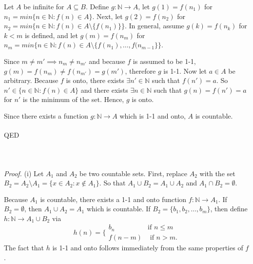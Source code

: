 \documentclass{article}
\begin{document}
            Let $A$ be infinite for $A \subseteq B$. Define $g:\mathbb{N} \to A$, let $g(1) = f(n_1)$ for $n_1 = min\{n \in \mathbb{N}: f(n) \in A\}$. Next, let $g(2) = f(n_2)$ for $n_2 = min\{n \in \mathbb{N}: f(n) \in A \setminus \{f(n_1)\}\}$. In general, assume $g(k) = f(n_k)$ for $k<m$ is defined, and let $g(m) = f(n_m)$ for $n_m = min\{n \in \mathbb{N}: f(n) \in A \setminus \{f(n_1), \dots, f(n_{m-1}\}\}$.
            
            Since $m \neq m' \implies n_m \neq n_{m'}$ and because $f$ is assumed to be 1-1, $g(m) = f(n_m) \neq f(n_{m'}) = g(m')$, therefore $g$ is 1-1. Now let $a \in A$ be arbitrary. Because $f$ is onto, there exists $\exists n' \in \mathbb{N}$ such that $f(n')=a$. So $n' \in \{n \in \mathbb{N} : f(n) \in A\}$ and there exists $\exists n \in \mathbb{N}$ such that $g(n) = f(n') = a$ for $n'$ is the minimum of the set. Hence, $g$ is onto.
            
            Since there exists a function $g: \mathbb{N} \to A$ which is 1-1 and onto, $A$ is countable.\\ \\
            QED \\ \\
            \\ \\
            \textit{Proof.} (i) Let $A_1$ and $A_2$ be two countable sets. First, replace $A_2$ with the set $B_2 = A_2 \setminus A_1 = \{x \in A_2 : x \notin A_1\}$. So that $A_1 \cup B_2 = A_1 \cup A_2$ and $A_1 \cap B_2 = \emptyset$.
            
            Because $A_1$ is countable, there exists a 1-1 and onto function $f: \mathbb{N} \to A_1$. If $B_2 = \emptyset$, then $A_1 \cup A_2 = A_1$ which is countable. If $B_2 = \{b_1,b_2,\dots,b_m\}$, then define $h:\mathbb{N} \to A_1 \cup B_2$ via
            \begin{equation*}
                h(n) = \bigg\{ \begin{matrix} b_n & \text{if } n \leq m \\ f(n-m) & \text{ if } n > m.\end{matrix}
            \end{equation*}
            The fact that $h$ is 1-1 and onto follows immediately from the same properties of $f$.
            
\end{document}
